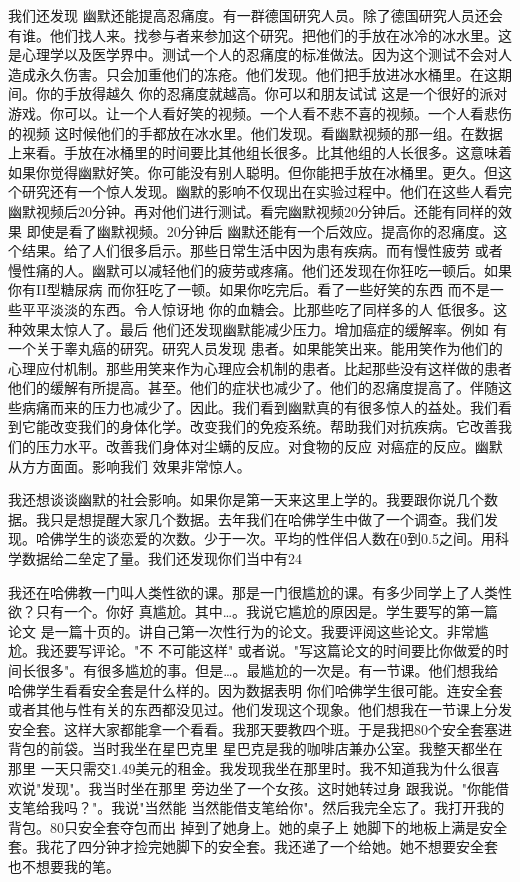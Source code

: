 我们还发现 幽默还能提高忍痛度。有一群德国研究人员。除了德国研究人员还会有谁。他们找人来。找参与者来参加这个研究。把他们的手放在冰冷的冰水里。这是心理学以及医学界中。测试一个人的忍痛度的标准做法。因为这个测试不会对人造成永久伤害。只会加重他们的冻疮。他们发现。他们把手放进冰水桶里。在这期间。你的手放得越久 你的忍痛度就越高。你可以和朋友试试 这是一个很好的派对游戏。你可以。让一个人看好笑的视频。一个人看不悲不喜的视频。一个人看悲伤的视频 这时候他们的手都放在冰水里。他们发现。看幽默视频的那一组。在数据上来看。手放在冰桶里的时间要比其他组长很多。比其他组的人长很多。这意味着 如果你觉得幽默好笑。你可能没有别人聪明。但你能把手放在冰桶里。更久。但这个研究还有一个惊人发现。幽默的影响不仅现出在实验过程中。他们在这些人看完幽默视频后20分钟。再对他们进行测试。看完幽默视频20分钟后。还能有同样的效果 即使是看了幽默视频。20分钟后 幽默还能有一个后效应。提高你的忍痛度。这个结果。给了人们很多启示。那些日常生活中因为患有疾病。而有慢性疲劳 或者慢性痛的人。幽默可以减轻他们的疲劳或疼痛。他们还发现在你狂吃一顿后。如果你有II型糖尿病 而你狂吃了一顿。如果你吃完后。看了一些好笑的东西 而不是一些平平淡淡的东西。令人惊讶地 你的血糖会。比那些吃了同样多的人 低很多。这种效果太惊人了。最后 他们还发现幽默能减少压力。增加癌症的缓解率。例如 有一个关于睾丸癌的研究。研究人员发现 患者。如果能笑出来。能用笑作为他们的心理应付机制。那些用笑来作为心理应会机制的患者。比起那些没有这样做的患者 他们的缓解有所提高。甚至。他们的症状也减少了。他们的忍痛度提高了。伴随这些病痛而来的压力也减少了。因此。我们看到幽默真的有很多惊人的益处。我们看到它能改变我们的身体化学。改变我们的免疫系统。帮助我们对抗疾病。它改善我们的压力水平。改善我们身体对尘螨的反应。对食物的反应 对癌症的反应。幽默从方方面面。影响我们 效果非常惊人。 

我还想谈谈幽默的社会影响。如果你是第一天来这里上学的。我要跟你说几个数据。我只是想提醒大家几个数据。去年我们在哈佛学生中做了一个调查。我们发现。哈佛学生的谈恋爱的次数。少于一次。平均的性伴侣人数在0到0.5之间。用科学数据给二垒定了量。我们还发现你们当中有24%

我还在哈佛教一门叫人类性欲的课。那是一门很尴尬的课。有多少同学上了人类性欲？只有一个。你好 真尴尬。其中…。我说它尴尬的原因是。学生要写的第一篇论文 是一篇十页的。讲自己第一次性行为的论文。我要评阅这些论文。非常尴尬。我还要写评论。"不 不可能这样" 或者说。"写这篇论文的时间要比你做爱的时间长很多"。有很多尴尬的事。但是…。最尴尬的一次是。有一节课。他们想我给哈佛学生看看安全套是什么样的。因为数据表明 你们哈佛学生很可能。连安全套或者其他与性有关的东西都没见过。他们发现这个现象。他们想我在一节课上分发安全套。这样大家都能拿一个看看。我那天要教四个班。于是我把80个安全套塞进背包的前袋。当时我坐在星巴克里 星巴克是我的咖啡店兼办公室。我整天都坐在那里 一天只需交1.49美元的租金。我发现我坐在那里时。我不知道我为什么很喜欢说"发现"。我当时坐在那里 旁边坐了一个女孩。这时她转过身 跟我说。"你能借支笔给我吗？"。我说"当然能 当然能借支笔给你"。然后我完全忘了。我打开我的背包。80只安全套夺包而出 掉到了她身上。她的桌子上 她脚下的地板上满是安全套。我花了四分钟才捡完她脚下的安全套。我还递了一个给她。她不想要安全套 也不想要我的笔。 

